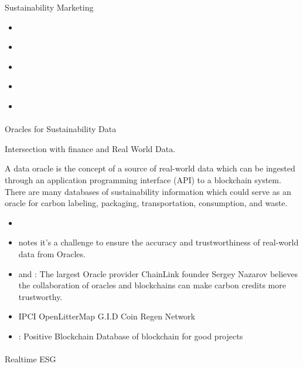 \documentclass[
  letterpaper,
  DIV=11,
  numbers=noendperiod]{scrartcl}
\makeatletter
\let\oldparagraph\paragraph
\renewcommand{\paragraph}{
    \@ifstar
      \xxxParagraphStar
      \xxxParagraphNoStar
  }
\newcommand{\xxxParagraphStar}[1]{\oldparagraph*{#1}\mbox{}}
\newcommand{\xxxParagraphNoStar}[1]{\oldparagraph{#1}\mbox{}}
\makeatother
\begin{document}
\begin{itemize}
  Sustainability Marketing

  \begin{itemize}
  \item
    \citet{ames15MostEnvironmentally2022}
  \item
    \citet{themuseeditorsCompaniesMakingPlanet2020}
  \item
    \citet{shradhabhattaTop10Companies2021}
  \item
    \citet{earth.orgWorld50Most2022}
  \item
    \citet{todd-ryanWhoAre100}
  \end{itemize}
\end{itemize}

\paragraph{Oracles for Sustainability
Data}\label{oracles-for-sustainability-data}

Intersection with finance and Real World Data.

A data oracle is the concept of a source of real-world data which can be
ingested through an application programming interface (API) to a
blockchain system. There are many databases of sustainability
information which could serve as an oracle for carbon labeling,
packaging, transportation, consumption, and waste.

\begin{itemize}
\item
  \citet{ethereumOracles2023}
\item
  \citet{caldarelliOvercomingBlockchainOracle2020} notes it's a
  challenge to ensure the accuracy and trustworthiness of real-world
  data from Oracles.
\item
  \citet{bradydaleChainlinkFounderSays2021} and
  \citet{chainlinkNewReportBlockchains2022}: The largest Oracle provider
  ChainLink founder Sergey Nazarov believes the collaboration of oracles
  and blockchains can make carbon credits more trustworthy.
\item
  IPCI OpenLitterMap G.I.D Coin Regen Network
\item
  \citet{dgen&positiveblockchainBlockchainSDGsHow2021}: Positive
  Blockchain Database of blockchain for good projects
\end{itemize}

\paragraph{Realtime ESG}\label{realtime-esg}
\end{document}
